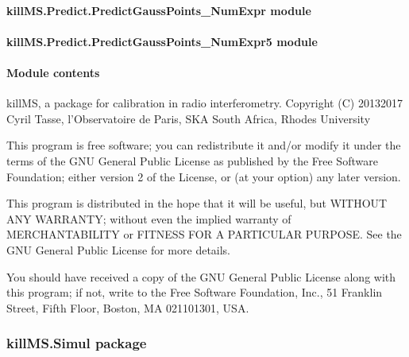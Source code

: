 \documentclass[letterpaper,10pt,english]{sphinxmanual}
\begin{document}
\paragraph{killMS.Predict.PredictGaussPoints\_NumExpr module}
\label{\detokenize{api/killMS.Predict:killms-predict-predictgausspoints-numexpr-module}}

\paragraph{killMS.Predict.PredictGaussPoints\_NumExpr5 module}
\label{\detokenize{api/killMS.Predict:killms-predict-predictgausspoints-numexpr5-module}}

\paragraph{Module contents}
\label{\detokenize{api/killMS.Predict:module-killMS.Predict}}\label{\detokenize{api/killMS.Predict:module-contents}}
\sphinxAtStartPar
killMS, a package for calibration in radio interferometry.
Copyright (C) 2013\sphinxhyphen{}2017  Cyril Tasse, l’Observatoire de Paris,
SKA South Africa, Rhodes University

\sphinxAtStartPar
This program is free software; you can redistribute it and/or
modify it under the terms of the GNU General Public License
as published by the Free Software Foundation; either version 2
of the License, or (at your option) any later version.

\sphinxAtStartPar
This program is distributed in the hope that it will be useful,
but WITHOUT ANY WARRANTY; without even the implied warranty of
MERCHANTABILITY or FITNESS FOR A PARTICULAR PURPOSE.  See the
GNU General Public License for more details.

\sphinxAtStartPar
You should have received a copy of the GNU General Public License
along with this program; if not, write to the Free Software
Foundation, Inc., 51 Franklin Street, Fifth Floor, Boston, MA  02110\sphinxhyphen{}1301, USA.

\sphinxstepscope


\subsubsection{killMS.Simul package}
\label{\detokenize{api/killMS.Simul:killms-simul-package}}\label{\detokenize{api/killMS.Simul::doc}}
\end{document}
